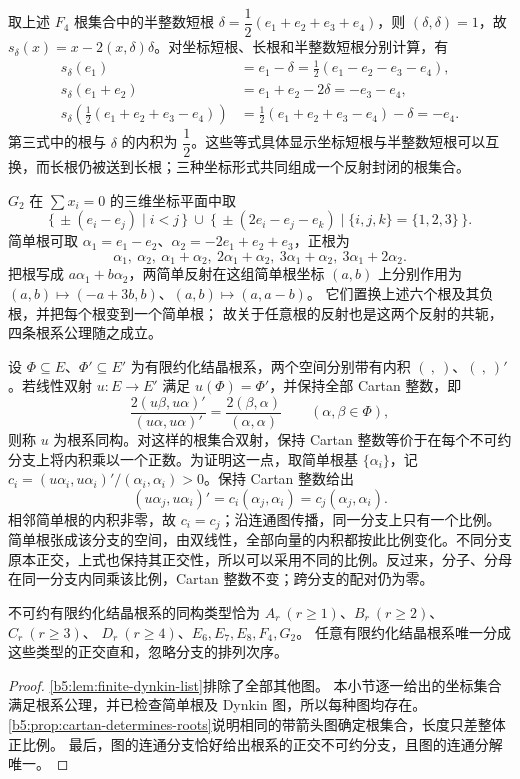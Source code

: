 \ProseParagraphBreak

取上述 \(F_4\) 根集合中的半整数短根 \(\delta=\dfrac12(e_1+e_2+e_3+e_4)\)，则 \((\delta,\delta)=1\)，故 \(s_\delta(x)=x-2(x,\delta)\delta\)。对坐标短根、长根和半整数短根分别计算，有
\[
	\begin{aligned}
		s_\delta(e_1)&=e_1-\delta =\frac12(e_1-e_2-e_3-e_4),\\
		s_\delta(e_1+e_2)&=e_1+e_2-2\delta=-e_3-e_4,\\
		s_\delta\!\left(\frac12(e_1+e_2+e_3-e_4)\right) &=\frac12(e_1+e_2+e_3-e_4)-\delta=-e_4.
	\end{aligned}
\]
第三式中的根与 \(\delta\) 的内积为 \(\dfrac12\)。这些等式具体显示坐标短根与半整数短根可以互换，而长根仍被送到长根；三种坐标形式共同组成一个反射封闭的根集合。

\ProseParagraphBreak

\(G_2\) 在 \(\sum x_i=0\) 的三维坐标平面中取
\[
	\bigl\{\,\pm(e_i-e_j)\mid i<j\,\bigr\} \ \cup\
	\bigl\{\,\pm(2e_i-e_j-e_k)\mid\{i,j,k\}=\{1,2,3\}\,\bigr\}.
\]
简单根可取 \(\alpha_1=e_1-e_2\)、\(\alpha_2=-2e_1+e_2+e_3\)，正根为
\[
	\alpha_1,\ \alpha_2,\ \alpha_1+\alpha_2,\
	2\alpha_1+\alpha_2,\ 3\alpha_1+\alpha_2,\
	3\alpha_1+2\alpha_2.
\]
把根写成 \(a\alpha_1+b\alpha_2\)，两简单反射在这组简单根坐标 \((a,b)\) 上分别作用为 \((a,b)\mapsto(-a+3b,b)\)、\((a,b)\mapsto(a,a-b)\)。 它们置换上述六个根及其负根，并把每个根变到一个简单根； 故关于任意根的反射也是这两个反射的共轭，四条根系公理随之成立。

设 \(\Phi\subseteq E\)、\(\Phi'\subseteq E'\) 为有限约化结晶根系，两个空间分别带有内积 \((\ ,\ )\)、\((\ ,\ )'\)。若线性双射 \(u:E\to E'\) 满足 \(u(\Phi)=\Phi'\)，并保持全部 Cartan 整数，即
\[
	\frac{2(u\beta,u\alpha)'}{(u\alpha,u\alpha)'} =\frac{2(\beta,\alpha)}{(\alpha,\alpha)} \qquad(\alpha,\beta\in\Phi),
\]
则称 \(u\) 为根系同构。对这样的根集合双射，保持 Cartan 整数等价于在每个不可约分支上将内积乘以一个正数。为证明这一点，取简单根基 \(\{\alpha_i\}\)，记 \(c_i=(u\alpha_i,u\alpha_i)'/(\alpha_i,\alpha_i)>0\)。保持 Cartan 整数给出
\[
	(u\alpha_j,u\alpha_i)'=c_i(\alpha_j,\alpha_i) =c_j(\alpha_j,\alpha_i).
\]
相邻简单根的内积非零，故 \(c_i=c_j\)；沿连通图传播，同一分支上只有一个比例。简单根张成该分支的空间，由双线性，全部向量的内积都按此比例变化。不同分支原本正交，上式也保持其正交性，所以可以采用不同的比例。反过来，分子、分母在同一分支内同乘该比例，Cartan 整数不变；跨分支的配对仍为零。

\begin{theorem}[根系分类]\label{b5:thm:root-classification}
	不可约有限约化结晶根系的同构类型恰为 \(A_r\ (r\geq1)\)、\(B_r\ (r\geq2)\)、\(C_r\ (r\geq3)\)、 \(D_r\ (r\geq4)\)、\(E_6,E_7,E_8,F_4,G_2\)。 任意有限约化结晶根系唯一分成这些类型的正交直和，忽略分支的排列次序。
\end{theorem}
\begin{proof}
	\cref{b5:lem:finite-dynkin-list}排除了全部其他图。 本小节逐一给出的坐标集合满足根系公理，并已检查简单根及 Dynkin 图，所以每种图均存在。 \cref{b5:prop:cartan-determines-roots}说明相同的带箭头图确定根集合，长度只差整体正比例。 最后，图的连通分支恰好给出根系的正交不可约分支，且图的连通分解唯一。
\end{proof}


